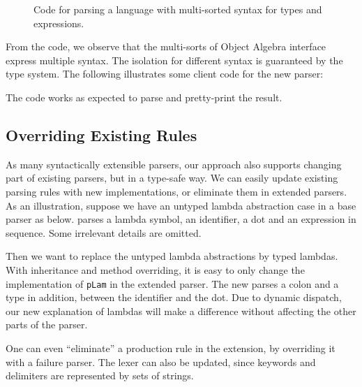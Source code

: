 \begin{figure}[ht]
\caption{Code for parsing a language with multi-sorted syntax for types and expressions.}
\label{fig:multi}
\end{figure}

From the code, we observe that the multi-sorts of Object Algebra interface
express multiple syntax. The isolation for different syntax
is guaranteed by the type system. The following illustrates some client code
for the new parser:

The code works as expected to parse and pretty-print the result.

\subsection{Overriding Existing Rules}

As many syntactically extensible parsers, our approach also supports changing part of existing parsers, but in a type-safe way. We can easily update existing parsing rules with new implementations, or eliminate them in extended parsers. As an illustration, suppose we have an untyped lambda abstraction case in a base parser as below.  parses a lambda symbol, an identifier, a dot and an expression in sequence. Some irrelevant details are omitted.


Then we want to replace the untyped lambda abstractions by typed lambdas. With inheritance and method overriding, it is easy to only change the implementation of \lstinline{pLam} in the extended parser. The new  parses a colon and a type in addition, between the identifier and the dot. Due to dynamic dispatch, our new explanation of lambdas will make a difference without affecting the other parts of the parser.



One can even ``eliminate'' a production rule in the extension, by overriding it with a failure parser. The lexer can also be updated, since keywords and delimiters are represented by sets of strings.

